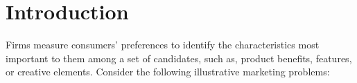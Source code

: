 \documentclass[nonblindrev]{informs3}
\begin{document}
%


\newpage


\section{Introduction}

Firms measure consumers' preferences to identify the characteristics most important to them among a set of candidates, such as, product benefits, features, or creative elements. Consider the following illustrative marketing problems:
\end{document}
